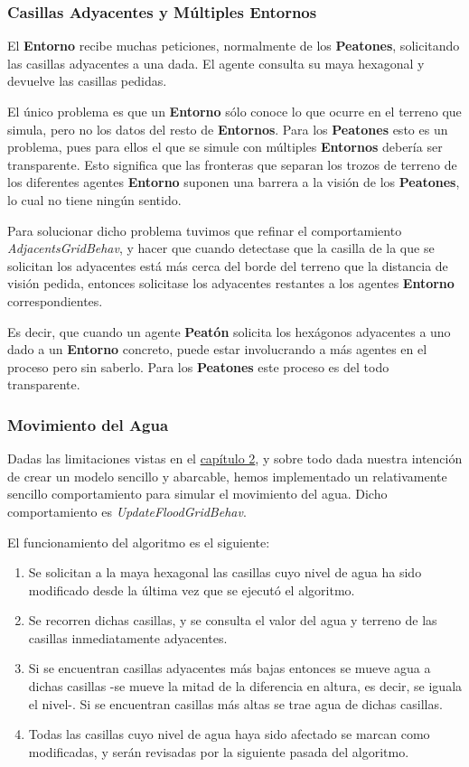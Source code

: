 \subsubsection*{Casillas Adyacentes y Múltiples Entornos}

El {\bf Entorno} recibe muchas peticiones, normalmente de los {\bf Peatones},
solicitando las casillas adyacentes a una dada. El agente consulta su maya
hexagonal y devuelve las casillas pedidas.

El único problema es que un {\bf Entorno} sólo conoce lo que ocurre en el
terreno que simula, pero no los datos del resto de {\bf Entornos}. Para los
{\bf Peatones} esto es un problema, pues para ellos el que se simule con
múltiples {\bf Entornos} debería ser transparente. Esto significa que las
fronteras que separan los trozos de terreno de los diferentes agentes {\bf
Entorno} suponen una barrera a la visión de los {\bf Peatones}, lo cual no
tiene ningún sentido.

Para solucionar dicho problema tuvimos que refinar el comportamiento {\em
AdjacentsGridBehav}, y hacer que cuando detectase que la casilla de la que se
solicitan los adyacentes está más cerca del borde del terreno que la distancia
de visión pedida, entonces solicitase los adyacentes restantes a los agentes
{\bf Entorno} correspondientes.

Es decir, que cuando un agente {\bf Peatón} solicita los hexágonos adyacentes a
uno dado a un {\bf Entorno} concreto, puede estar involucrando a más agentes en
el proceso pero sin saberlo. Para los {\bf Peatones} este proceso es del todo
transparente.

\subsubsection{Movimiento del Agua}\label{waterMovement}

Dadas las limitaciones vistas en el \hyperref[cap2]{capítulo 2}, y sobre todo
dada nuestra intención de crear un modelo sencillo y abarcable, hemos
implementado un relativamente sencillo comportamiento para simular el
movimiento del agua. Dicho comportamiento es {\em UpdateFloodGridBehav}.

El funcionamiento del algoritmo es el siguiente:

\begin{enumerate}
 \item Se solicitan a la maya hexagonal las casillas cuyo nivel de agua ha sido
 modificado desde la última vez que se ejecutó el algoritmo.
 \item Se recorren dichas casillas, y se consulta el valor del agua y terreno
 de las casillas inmediatamente adyacentes.
 \item Si se encuentran casillas adyacentes más bajas entonces se mueve agua a
 dichas casillas -se mueve la mitad de la diferencia en altura, es decir, se
 iguala el nivel-. Si se encuentran casillas más altas se trae agua de dichas
 casillas.
 \item Todas las casillas cuyo nivel de agua haya sido afectado se marcan como
 modificadas, y serán revisadas por la siguiente pasada del algoritmo.
\end{enumerate}

